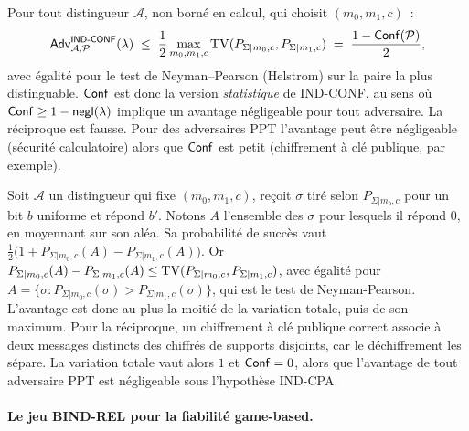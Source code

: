 \begin{sloppypar}
\begin{remark}
\label{rem:jeu_ind_conf_link}
Pour tout distingueur $\mathcal{A}$, non born\'e en calcul, qui choisit
$(m_0,m_1,c)$~:
\begin{equation}
\mathsf{Adv}^{\mathsf{IND\text{-}CONF}}_{\mathcal{A},\mathcal{P}}(\lambda)
\;\leq\; \frac{1}{2}\max_{m_0,m_1,c}\operatorname{TV}(P_{\Sigma|m_0,c},P_{\Sigma|m_1,c})
\;=\; \frac{1 - \mathsf{Conf}(\mathcal{P})}{2},
\end{equation}
avec \'egalit\'e pour le test de Neyman--Pearson (Helstrom) sur la paire la
plus distinguable. $\mathsf{Conf}$ est donc la version \emph{statistique} de
IND-CONF, au sens o\`u $\mathsf{Conf} \geq 1 - \mathsf{negl}(\lambda)$ implique un avantage n\'egligeable
pour tout adversaire. La r\'eciproque est fausse. Pour des adversaires PPT
l'avantage peut \^etre n\'egligeable (s\'ecurit\'e calculatoire) alors que
$\mathsf{Conf}$ est petit (chiffrement \`a cl\'e publique, par exemple).
\end{remark}

\begin{Preuve}
Soit $\mathcal{A}$ un distingueur qui fixe $(m_0,m_1,c)$, re\c{c}oit $\sigma$ tir\'e
selon $P_{\Sigma|m_b,c}$ pour un bit $b$ uniforme et r\'epond $b'$. Notons $A$
l'ensemble des $\sigma$ pour lesquels il r\'epond $0$, en moyennant sur son
al\'ea. Sa probabilit\'e de succ\`es vaut
$\tfrac12\bigl(1 + P_{\Sigma|m_0,c}(A) - P_{\Sigma|m_1,c}(A)\bigr)$. Or
$P_{\Sigma|m_0,c}(A) - P_{\Sigma|m_1,c}(A) \leq \operatorname{TV}(P_{\Sigma|m_0,c},P_{\Sigma|m_1,c})$,
avec \'egalit\'e pour $A = \{\sigma : P_{\Sigma|m_0,c}(\sigma) > P_{\Sigma|m_1,c}(\sigma)\}$,
qui est le test de Neyman-Pearson. L'avantage est donc au plus la moiti\'e de
la variation totale, puis de son maximum. Pour la r\'eciproque, un chiffrement \`a
cl\'e publique correct associe \`a deux messages distincts des chiffr\'es de
supports disjoints, car le d\'echiffrement les s\'epare. La variation totale vaut
alors $1$ et $\mathsf{Conf} = 0$, alors que l'avantage de tout adversaire PPT est
n\'egligeable sous l'hypoth\`ese IND-CPA.
\end{Preuve}

\paragraph{Le jeu BIND-REL pour la fiabilit\'e game-based.}
\label{subsubsubsec:jeu_bind_rel}


\end{sloppypar}
